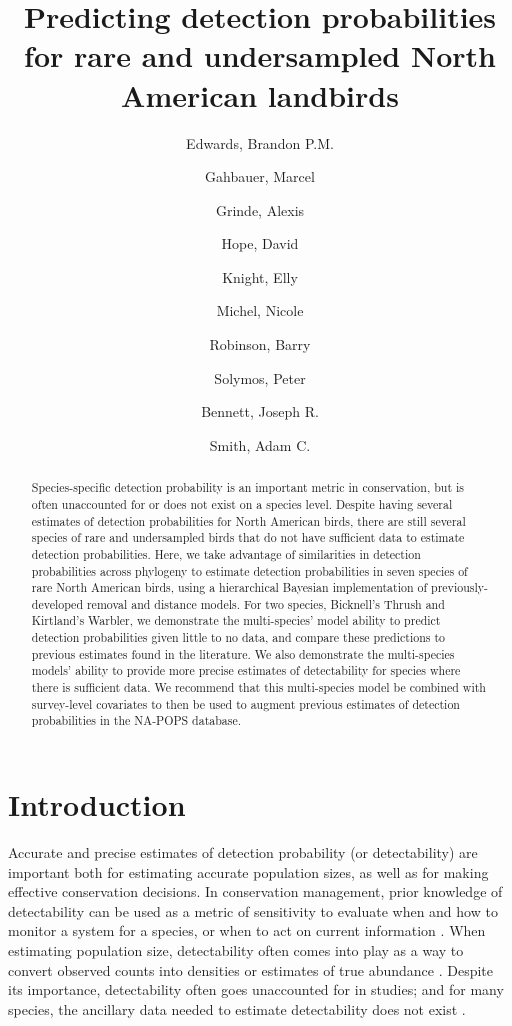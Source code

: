 \documentclass[12pt]{article}
\title{Predicting detection probabilities for rare and undersampled North American landbirds}
\author{
	Edwards, Brandon P.M.\\
	\and
	Gahbauer, Marcel\\
	\and
	Grinde, Alexis\\
	\and
	Hope, David\\
	\and
	Knight, Elly\\
	\and
	Michel, Nicole\\
	\and
	Robinson, Barry\\
	\and
	Solymos, Peter\\
	\and
	Bennett, Joseph R.\\
	\and
	Smith, Adam C.\\
}
\begin{document}
\maketitle

\begin{abstract}
	
	Species-specific detection probability is an important metric in conservation, but is often unaccounted for or does not exist on a species level. Despite having several estimates of detection probabilities for North American birds, there are still several species of rare and undersampled birds that do not have sufficient data to estimate detection probabilities. Here, we take advantage of similarities in detection probabilities across phylogeny to estimate detection probabilities in seven species of rare North American birds, using a hierarchical Bayesian implementation of previously-developed removal and distance models. For two species, Bicknell's Thrush and Kirtland's Warbler, we demonstrate the multi-species' model ability to predict detection probabilities given little to no data, and compare these predictions to previous estimates found in the literature. We also demonstrate the multi-species models' ability to provide more precise estimates of detectability for species where there is sufficient data. We recommend that this multi-species model be combined with survey-level covariates to then be used to augment previous estimates of detection probabilities in the NA-POPS database.

\end{abstract}

\section{Introduction}

\par Accurate and precise estimates of detection probability (or detectability) are important both for estimating accurate population sizes, as well as for making effective conservation decisions.
In conservation management, prior knowledge of detectability can be used as a metric of sensitivity to evaluate when and how to monitor a system for a species, or when to act on current information \citep{canessa_when_2015, bennett_when_2018}. 
When estimating population size, detectability often comes into play as a way to convert observed counts into densities or estimates of true abundance \citep{solymos_calibrating_2013, johnson_defense_2008}.
Despite its importance, detectability often goes unaccounted for in studies; and for many species, the ancillary data needed to estimate detectability does not exist \citep{bennett_how_2023}.
\end{document}

